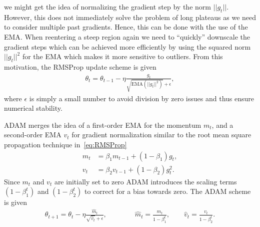we might get the idea of normalizing the gradient step by the norm $||g_t||$. However, this does not immediately solve the problem of long plateaus as we need to consider multiple past gradients. Hence, this can be done with the use of the \acrshort{EMA}. When reentering a steep region again we need to ``quickly'' downscale the gradient steps which can be achieved more efficiently by using the squared norm $||g_t||^2$ for the \acrshort{EMA} which makes it more sensitive to outliers. From this motivation, the \acrshort{RMSProp} update scheme is given
\begin{align}
  \theta_t = \theta_{t-1} - \eta \frac{g_t}{\sqrt{\text{EMA}(||g_t||^2)}+ \epsilon},
  \label{eq:RMSProp}
\end{align}
where $\epsilon$ is simply a small number to avoid division by zero issues and thus ensure numerical stability.

ADAM merges the idea of a first-order \acrshort{EMA} for the momentum $m_t$, and a second-order \acrshort{EMA} $v_t$ for gradient normalization similar to the root mean square propagation technique in~\cref{eq:RMSProp}
\begin{align*}
  m_t &= \beta_1 m_{t-1} + (1-\beta_1)g_t, \\
  v_t &= \beta_2 v_{t-1} + (1-\beta_2)g_t^2. 
\end{align*}
Since $m_t$ and $v_t$ are initially set to zero ADAM introduces the scaling terms  $(1-\beta^t_1)$ and $(1-\beta^t_2)$ to correct for a bias towards zero. The ADAM scheme is given~\cite{kingma2017adam}
\begin{align}
  \theta_{t+1} = \theta_t - \eta \frac{\hat{m}_t}{\sqrt{\hat{v}_t} + \epsilon}, \qquad \qquad \hat{m}_t = \frac{m_t}{1-\beta^t_1}, \qquad \hat{v}_t = \frac{v_t}{1-\beta^t_2}.
  \label{eq:ADAM}
\end{align}


